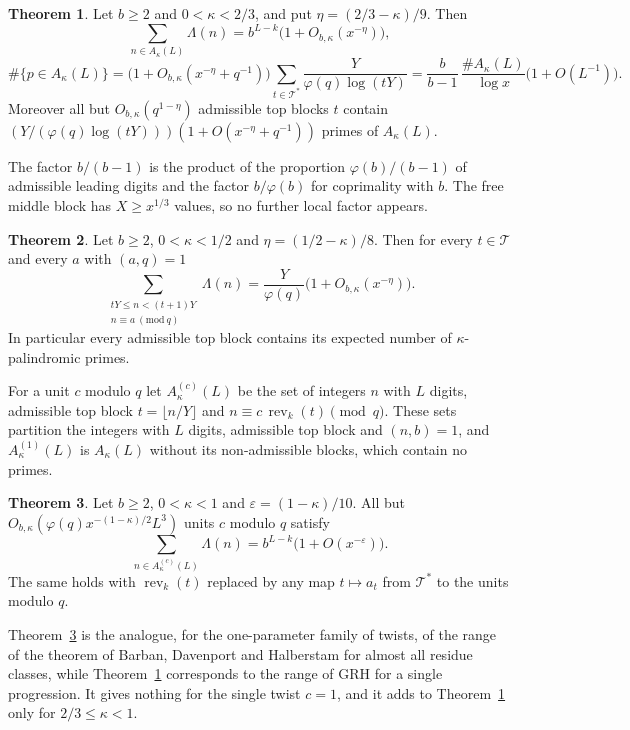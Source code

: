 \documentclass[11pt]{amsart}
\theoremstyle{definition}
\newtheorem{theorem}{Theorem}[section]
\numberwithin{equation}{section}
\newcommand{\rev}{\operatorname{rev}}
\newcommand{\cT}{\mathcal{T}}
\begin{document}
\begin{theorem}\label{thm:main}
Let $b\ge2$ and $0<\kappa<2/3$, and put $\eta=(2/3-\kappa)/9$. Then
\[
\sum_{n\in A_\kappa(L)}\Lambda(n)=b^{L-k}\bigl(1+O_{b,\kappa}(x^{-\eta})\bigr),
\]
\[
\#\{p\in A_\kappa(L)\}=\bigl(1+O_{b,\kappa}(x^{-\eta}+q^{-1})\bigr)\sum_{t\in\cT^*}\frac{Y}{\varphi(q)\log(tY)}=\frac{b}{b-1}\,\frac{\#A_\kappa(L)}{\log x}\bigl(1+O(L^{-1})\bigr).
\]
Moreover all but $O_{b,\kappa}(q^{1-\eta})$ admissible top blocks $t$ contain $(Y/(\varphi(q)\log(tY)))(1+O(x^{-\eta}+q^{-1}))$ primes of $A_\kappa(L)$.
\end{theorem}

The factor $b/(b-1)$ is the product of the proportion $\varphi(b)/(b-1)$ of admissible leading digits and the factor $b/\varphi(b)$ for coprimality with $b$. The free middle block has $X\ge x^{1/3}$ values, so no further local factor appears.

\begin{theorem}\label{thm:block}
Let $b\ge2$, $0<\kappa<1/2$ and $\eta=(1/2-\kappa)/8$. Then for every $t\in\cT$ and every $a$ with $(a,q)=1$
\[
\sum_{\substack{tY\le n<(t+1)Y\\ n\equiv a\ (\mathrm{mod}\ q)}}\Lambda(n)=\frac{Y}{\varphi(q)}\bigl(1+O_{b,\kappa}(x^{-\eta})\bigr).
\]
In particular every admissible top block contains its expected number of $\kappa$-palindromic primes.
\end{theorem}

For a unit $c$ modulo $q$ let $A^{(c)}_\kappa(L)$ be the set of integers $n$ with $L$ digits, admissible top block $t=\lfloor n/Y\rfloor$ and $n\equiv c\,\rev_k(t)\pmod q$. These sets partition the integers with $L$ digits, admissible top block and $(n,b)=1$, and $A^{(1)}_\kappa(L)$ is $A_\kappa(L)$ without its non-admissible blocks, which contain no primes.

\begin{theorem}\label{thm:twists}
Let $b\ge2$, $0<\kappa<1$ and $\varepsilon=(1-\kappa)/10$. All but $O_{b,\kappa}(\varphi(q)x^{-(1-\kappa)/2}L^3)$ units $c$ modulo $q$ satisfy
\[
\sum_{n\in A^{(c)}_\kappa(L)}\Lambda(n)=b^{L-k}\bigl(1+O(x^{-\varepsilon})\bigr).
\]
The same holds with $\rev_k(t)$ replaced by any map $t\mapsto a_t$ from $\cT^*$ to the units modulo $q$.
\end{theorem}

Theorem~\ref{thm:twists} is the analogue, for the one-parameter family of twists, of the range of the theorem of Barban, Davenport and Halberstam \cite{DH66} for almost all residue classes, while Theorem~\ref{thm:main} corresponds to the range of GRH for a single progression. It gives nothing for the single twist $c=1$, and it adds to Theorem~\ref{thm:main} only for $2/3\le\kappa<1$.
\end{document}
